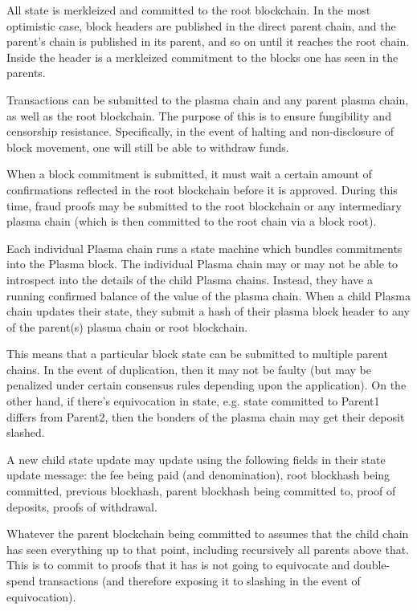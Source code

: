 \documentclass[letterpaper, 11pt]{article}
\begin{document}
All state is merkleized and committed to the root blockchain. In the most
optimistic case, block headers are published in the direct parent chain, and the
parent's chain is published in its parent, and so on until it reaches the root
chain. Inside the header is a merkleized commitment to the blocks one has seen
in the parents.

Transactions can be submitted to the plasma chain and any parent plasma chain,
as well as the root blockchain. The purpose of this is to ensure fungibility and
censorship resistance. Specifically, in the event of halting and non-disclosure
of block movement, one will still be able to withdraw funds.

When a block commitment is submitted, it must wait a certain amount of
confirmations reflected in the root blockchain before it is approved. During
this time, fraud proofs may be submitted to the root blockchain or any
intermediary plasma chain (which is then committed to the root chain via a block
root).

Each individual Plasma chain runs a state machine which bundles commitments into
the Plasma block. The individual Plasma chain may or may not be able to
introspect into the details of the child Plasma chains. Instead, they have a
running confirmed balance of the value of the plasma chain. When a child Plasma
chain updates their state, they submit a hash of their plasma block header to
any of the parent(s) plasma chain or root blockchain.

This means that a particular block state can be submitted to multiple parent
chains. In the event of duplication, then it may not be faulty (but may be
penalized under certain consensus rules depending upon the application). On the
other hand, if there's equivocation in state, e.g. state committed to Parent1
differs from Parent2, then the bonders of the plasma chain may get their deposit
slashed.

A new child state update may update using the following fields in their state
update message: the fee being paid (and denomination), root blockhash being
committed, previous blockhash, parent blockhash being committed to, proof of
deposits, proofs of withdrawal.

Whatever the parent blockchain being committed to assumes that the child chain
has seen everything up to that point, including recursively all parents above
that. This is to commit to proofs that it has is not going to equivocate and
double-spend transactions (and therefore exposing it to slashing in the event of
equivocation).
\end{document}
